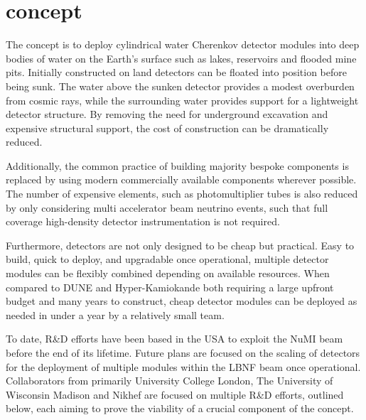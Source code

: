 \section{\chips concept} %
\label{sec:chips_concept} %

The \chips concept is to deploy cylindrical water Cherenkov detector modules into deep bodies of
water on the Earth's surface such as lakes, reservoirs and flooded mine pits. Initially
constructed on land \chips detectors can be floated into position before being sunk. The water
above the sunken detector provides a modest overburden from cosmic rays, while the surrounding
water provides support for a lightweight detector structure. By removing the need for underground
excavation and expensive structural support, the cost of construction can be dramatically reduced.

Additionally, the common practice of building majority bespoke components is replaced by using
modern commercially available components wherever possible. The number of expensive elements, such
as photomultiplier tubes is also reduced by only considering multi \GeV accelerator beam neutrino
events, such that full coverage high-density detector instrumentation is not required.

Furthermore, \chips detectors are not only designed to be cheap but practical. Easy to build,
quick to deploy, and upgradable once operational, multiple detector modules can be flexibly
combined depending on available resources. When compared to DUNE and Hyper-Kamiokande both
requiring a large upfront budget and many years to construct, cheap \chips detector modules can be
deployed as needed in under a year by a relatively small team.

To date, \chips R\&D efforts have been based in the USA to exploit the NuMI beam before the end of
its lifetime. Future plans are focused on the scaling of \chips detectors for the deployment of
multiple modules within the LBNF beam once operational. Collaborators from primarily University
College London, The University of Wisconsin Madison and Nikhef are focused on multiple R\&D
efforts, outlined below, each aiming to prove the viability of a crucial component of the \chips
concept.

